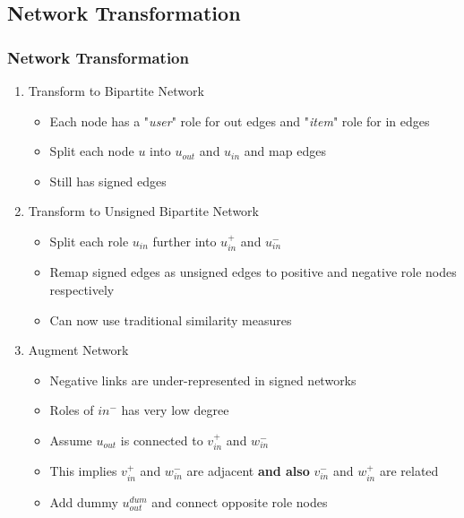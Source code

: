 \documentclass{beamer}
\begin{document}
\subsection{Network Transformation}
\begin{frame}
    \frametitle{Network Transformation}
    \begin{enumerate}
        \item<1-> Transform to Bipartite Network
        \begin{itemize}
            \item<2-> Each node has a "\textit{user}" role for out edges and "\textit{item}" role for in edges
            \item<2-> Split each node $u$ into $u_{out}$ and $u_{in}$ and map edges 
            \item<2-> Still has signed edges
        \end{itemize}
        \item<1-> Transform to Unsigned Bipartite Network
        \begin{itemize}
            \item<3-> Split each role $u_{in}$ further into $u_{in}^{+}$ and $u_{in}^{-}$
            \item<3-> Remap signed edges as unsigned edges to positive and negative role nodes respectively
            \item<3-> Can now use traditional similarity measures
        \end{itemize}
        \item<1-> Augment Network
        \begin{itemize}
            \item<4-> Negative links are under-represented in signed networks
            \item<4-> Roles of $in^{-}$ has very low degree
            \item<4-> Assume $u_{out}$ is connected to $v_{in}^{+}$ and $w_{in}^{-}$
            \item<4-> This implies $v_{in}^{+}$ and $w_{in}^{-}$  are adjacent \textbf{and also} $v_{in}^{-}$ and $w_{in}^{+}$ are related  
            \item<4-> Add dummy $u_{out}^{dum}$ and connect opposite role nodes
        \end{itemize}
    \end{enumerate}
    

\end{frame}
\end{document}
